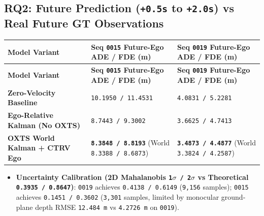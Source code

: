 \documentclass[10.5pt,a4paper]{article}
\begin{document}
\subsection{RQ2: Future Prediction (\texttt{+0.\allowbreak{}5s} to \texttt{+2.\allowbreak{}0s}) vs Real Future GT Observations}

\begin{footnotesize}
\setlength{\tabcolsep}{4pt}
\setlength{\LTleft}{0pt}\setlength{\LTright}{0pt}
\begin{longtable}{>{\raggedright\arraybackslash}p{} >{\raggedright\arraybackslash}p{} >{\raggedright\arraybackslash}p{}}
\toprule
\textbf{Model Variant} & \textbf{Seq \texttt{0015} Future-Ego ADE / FDE (m)} & \textbf{Seq \texttt{0019} Future-Ego ADE / FDE (m)} \\
\midrule
\endfirsthead
\toprule
\textbf{Model Variant} & \textbf{Seq \texttt{0015} Future-Ego ADE / FDE (m)} & \textbf{Seq \texttt{0019} Future-Ego ADE / FDE (m)} \\
\midrule
\endhead
\bottomrule
\endfoot
\textbf{Zero-Velocity Baseline} & \texttt{10.\allowbreak{}1950 /\allowbreak{} 11.\allowbreak{}4531} & \texttt{4.\allowbreak{}0831 /\allowbreak{} 5.\allowbreak{}2281} \\
\textbf{Ego-Relative Kalman (No OXTS)} & \texttt{8.\allowbreak{}7443 /\allowbreak{} 9.\allowbreak{}3002} & \texttt{3.\allowbreak{}6625 /\allowbreak{} 4.\allowbreak{}7413} \\
\textbf{OXTS World Kalman + CTRV Ego} & \textbf{\texttt{8.\allowbreak{}3848 /\allowbreak{} 8.\allowbreak{}8193}} (World \texttt{8.\allowbreak{}3388 /\allowbreak{} 8.\allowbreak{}6873}) & \textbf{\texttt{3.\allowbreak{}4873 /\allowbreak{} 4.\allowbreak{}4877}} (World \texttt{3.\allowbreak{}3824 /\allowbreak{} 4.\allowbreak{}2587}) \\
\end{longtable}
\end{footnotesize}


\begin{itemize}[leftmargin=1.5em,itemsep=2pt]
\item \textbf{Uncertainty Calibration (2D Mahalanobis \texttt{1$\sigma$ /\allowbreak{} 2$\sigma$} vs Theoretical \texttt{0.\allowbreak{}3935 /\allowbreak{} 0.\allowbreak{}8647})}: \texttt{0019} achieves \texttt{0.\allowbreak{}4138 /\allowbreak{} 0.\allowbreak{}6149} (\texttt{9,\allowbreak{}156} samples); \texttt{0015} achieves \texttt{0.\allowbreak{}1451 /\allowbreak{} 0.\allowbreak{}3602} (\texttt{3,\allowbreak{}301} samples, limited by monocular ground-plane depth RMSE \texttt{12.\allowbreak{}484 m} vs \texttt{4.\allowbreak{}2726 m} on \texttt{0019}).
\end{itemize}
\end{document}
